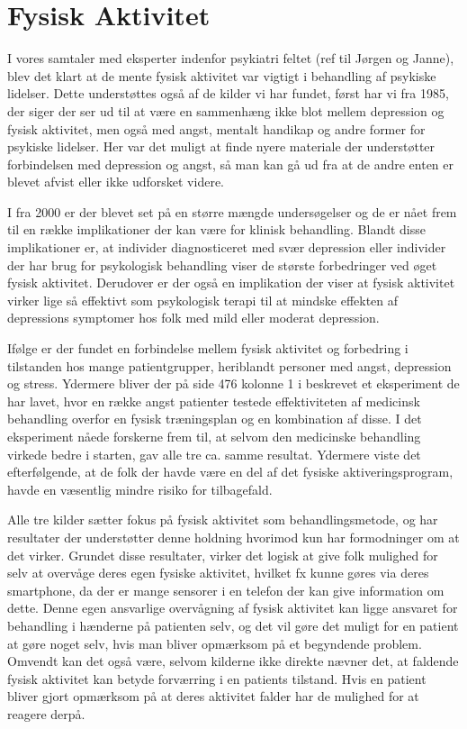 \section{Fysisk Aktivitet}
I vores samtaler med eksperter indenfor psykiatri feltet (ref til Jørgen og Janne), blev det klart at de mente fysisk aktivitet var vigtigt i behandling af psykiske lidelser.
Dette understøttes også af de kilder vi har fundet, først har vi \citet{misc:healthReports} fra 1985, der siger der ser ud til at være en sammenhæng ikke blot mellem depression og fysisk aktivitet, men også med angst, mentalt handikap og andre former for psykiske lidelser.
Her var det muligt at finde nyere materiale der understøtter forbindelsen med depression og angst, så man kan gå ud fra at de andre enten er blevet afvist eller ikke udforsket videre.

I \citet{art:physMental} fra 2000 er der blevet set på en større mængde undersøgelser og de er nået frem til en række implikationer der kan være for klinisk behandling.
Blandt disse implikationer er, at individer diagnosticeret med svær depression eller individer der har brug for psykologisk behandling viser de største forbedringer ved øget fysisk aktivitet.
Derudover er der også en implikation der viser at fysisk aktivitet virker lige så effektivt som psykologisk terapi til at mindske effekten af depressions symptomer hos folk med mild eller moderat depression.

Ifølge \citet{book:sportPsyc} er der fundet en forbindelse mellem fysisk aktivitet og forbedring i tilstanden hos mange patientgrupper, heriblandt personer med angst, depression og stress.
Ydermere bliver der på side 476 kolonne 1 i \citet{book:sportPsyc} beskrevet et eksperiment de har lavet, hvor en række angst patienter testede effektiviteten af medicinsk behandling overfor en fysisk træningsplan og en kombination af disse.
I det eksperiment nåede forskerne frem til, at selvom den medicinske behandling virkede bedre i starten, gav alle tre ca. samme resultat.
Ydermere viste det efterfølgende, at de folk der havde være en del af det fysiske aktiveringsprogram, havde en væsentlig mindre risiko for tilbagefald.

Alle tre kilder sætter fokus på fysisk aktivitet som behandlingsmetode, \citet{art:physMental} og \citet{book:sportPsyc} har resultater der understøtter denne holdning hvorimod \citet{misc:healthReports} kun har formodninger om at det virker.
Grundet disse resultater, virker det logisk at give folk mulighed for selv at overvåge deres egen fysiske aktivitet, hvilket fx kunne gøres via deres smartphone, da der er mange sensorer i en telefon der kan give information om dette.
Denne egen ansvarlige overvågning af fysisk aktivitet kan ligge ansvaret for behandling i hænderne på patienten selv, og det vil gøre det muligt for en patient at gøre noget selv, hvis man bliver opmærksom på et begyndende problem.
Omvendt kan det også være, selvom kilderne ikke direkte nævner det, at faldende fysisk aktivitet kan betyde forværring i en patients tilstand.
Hvis en patient bliver gjort opmærksom på at deres aktivitet falder har de mulighed for at reagere derpå.

